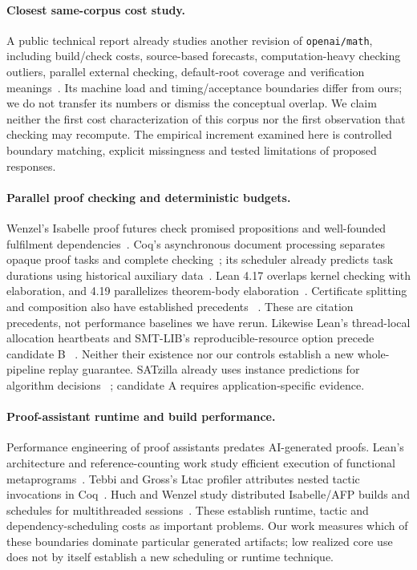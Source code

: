 \documentclass[10pt,twocolumn]{article}
\begin{document}
\paragraph{Closest same-corpus cost study.}
A public technical report already studies another revision of
\texttt{openai/math}, including build/check costs, source-based forecasts,
computation-heavy checking outliers, parallel external checking, default-root
coverage and verification meanings~\cite{openaiMathTooling2026}.
Its machine load and timing/acceptance boundaries differ from ours; we
do not transfer its numbers or dismiss the conceptual overlap.
We claim neither the first cost characterization of this corpus nor
the first observation that checking may recompute.
The empirical increment examined here is controlled boundary matching,
explicit missingness and tested limitations of proposed responses.


\paragraph{Parallel proof checking and deterministic budgets.}
Wenzel's Isabelle proof futures check promised propositions and
well-founded fulfilment dependencies~\cite{wenzelParallel2009}.
Coq's asynchronous document processing separates opaque proof tasks and
complete checking~\cite{coqAsync2015}; its scheduler already predicts task
durations using historical auxiliary data~\cite{coqAsyncManual2023}.
Lean 4.17 overlaps kernel checking with elaboration, and 4.19 parallelizes
theorem-body elaboration~\cite{leanParallelRelease2025,leanKernelParallel2025}.
Certificate splitting and composition also have established precedents
~\cite{selfCertification2012}.
These are citation precedents, not performance baselines we have rerun.
Likewise Lean's thread-local allocation heartbeats and SMT-LIB's
reproducible-resource option precede candidate B
~\cite{leanHeartbeats2026,smtlib27}. Neither their existence nor our controls
establish a new whole-pipeline replay guarantee.
SATzilla already uses instance predictions for algorithm decisions
~\cite{satzilla2008}; candidate A requires application-specific evidence.

\paragraph{Proof-assistant runtime and build performance.}
Performance engineering of proof assistants predates AI-generated proofs.
Lean's architecture and reference-counting work study efficient execution
of functional metaprograms~\cite{lean4,countingBeans}.
Tebbi and Gross's Ltac profiler attributes nested tactic invocations in
Coq~\cite{ltacProfiler2015}. Huch and Wenzel study distributed Isabelle/AFP
builds and schedules for multithreaded sessions~\cite{isabelleBuild2024}.
These establish runtime, tactic and dependency-scheduling costs as important
problems. Our work measures which of these boundaries dominate particular
generated artifacts; low realized core use does not by itself establish a
new scheduling or runtime technique.
\end{document}
